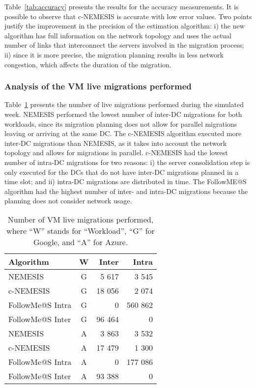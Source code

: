 Table~\ref{tab:accuracy} presents the results for the accuracy measurements. It is possible to observe that c-NEMESIS is accurate with low error values. Two points justify the improvement in the precision of the estimation algorithm: i) the new algorithm has full information on the network topology and uses the actual number of links that interconnect the servers involved in the migration process; ii) since it is more precise, the migration planning results in less network congestion, which affects the duration of the migration.


\subsubsection{Analysis of the VM live migrations performed}
\label{sec:analysis_vms_migs_smargreens}

Table~\ref{tab:amount_migs} presents the number of live migrations performed during the simulated week. NEMESIS performed the lowest number of inter-DC migrations for both workloads, since its migration planning does not allow for parallel migrations leaving or arriving at the same DC. The c-NEMESIS algorithm executed more inter-DC migrations than NEMESIS, as it takes into account the network topology and allows for migrations in parallel. c-NEMESIS had the lowest number of intra-DC migrations for two reasons: i) the server consolidation step is only executed for the DCs that do not have inter-DC migrations planned in a time slot; and ii) intra-DC migrations are distributed in time. The FollowME@S algorithm had the highest number of inter- and intra-DC migrations because the planning does not consider network usage.

\begin{table}[h]
\caption{Number of VM live migrations performed, where ``W'' stands for ``Workload'', ``G'' for Google, and ``A'' for Azure. }\label{tab:amount_migs} \centering
\begin{tabular}{|l|c|r|r|}
  \hline
  \textbf{Algorithm} & \textbf{W}  & \textbf{Inter} & \textbf{Intra}   \\
  \hline
  NEMESIS  & G & 5 617  & 3 545 \\
  \hline
  c-NEMESIS & G & 18 056  & 2 074 \\
  \hline
  FollowMe@S Intra  & G & 0  & 560 862 \\
  \hline
  FollowMe@S Inter  & G & 96 464 & 0 \\
  \hline
  NEMESIS & A & 3 863 & 3 532 \\
  \hline
  c-NEMESIS & A & 17 479  & 1 300 \\
  \hline
  FollowMe@S Intra  & A & 0  & 177 086 \\
  \hline
  FollowMe@S Inter   & A & 93 388 & 0 \\
  \hline
\end{tabular}
\end{table}

